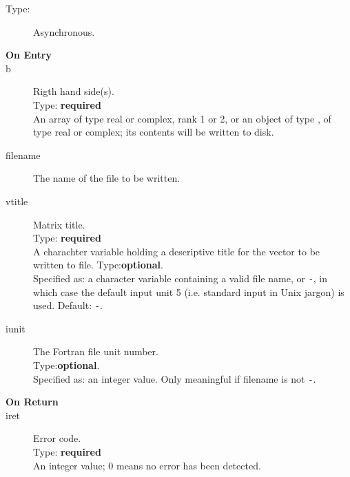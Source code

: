 \begin{description}
\item[Type:] Asynchronous.
\item[\bf  On Entry ]
\item[b] Rigth hand side(s).\\
Type: {\bf required} \\
An  array of type real or complex, rank 1 or 2, or an
object of type \vdata, of type real or complex; its contents will be
written to disk.\\
\item[filename] The name of the file to be written.\\
\item[vtitle] Matrix title.\\
Type: {\bf required} \\
A charachter variable holding a descriptive title for the vector to be
 written to file.
Type:{\bf optional}.\\
Specified as: a character variable containing a valid file name, or
\verb|-|, in which case the default input unit  5 (i.e. standard input
in Unix jargon) is used. Default: \verb|-|. 
\item[iunit] The Fortran file unit number.\\
Type:{\bf optional}.\\
Specified as: an integer value. Only meaningful if filename is not \verb|-|.
\end{description}

\begin{description}
\item[\bf On Return]
\item[iret] Error code.\\
Type: {\bf required} \\
An integer value; 0 means no error has been detected. 
\end{description}



